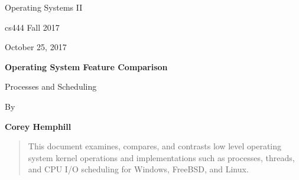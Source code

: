 \documentclass[letterpaper,10pt,draftclsnofoot,onecolumn]{IEEEtran}
\def \Author{Corey Hemphill}
\def \Title{Operating System Feature Comparison}
\def \Subtitle{Processes and Scheduling}
\def \Term{cs444 Fall 2017}
\def \DueDate{October 25, 2017}
\def \DocType{
	Operating Systems II
}
\begin{document}
\begin{titlepage}
    \begin{singlespace}
        \hfill  
        \par\vspace{.2in}
        \centering
        \scshape{
            \huge  \DocType \par
           	\huge \Term \par
            {\large \DueDate}\par
            \vspace{.5in}
            \textbf{\Huge \Title}\par
            {\large \Subtitle}\par
            \vspace{.5in}
           
            {\large By }\par
           	\textbf{\Author}\par
   
            \vspace{5pt}
            }
            \vspace{120pt}
        
        \begin{abstract}
        This document examines, compares, and contrasts low level operating system kernel operations and implementations such as processes, threads, and CPU I/O scheduling for Windows, FreeBSD, and Linux.
        \end{abstract} 
        
    \end{singlespace}
\end{titlepage}
\newpage
\end{document}

